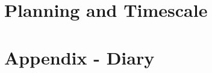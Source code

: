 \documentclass{article}
\begin{document}
\section{Planning and Timescale}

\section{Appendix - Diary}
\end{document}
